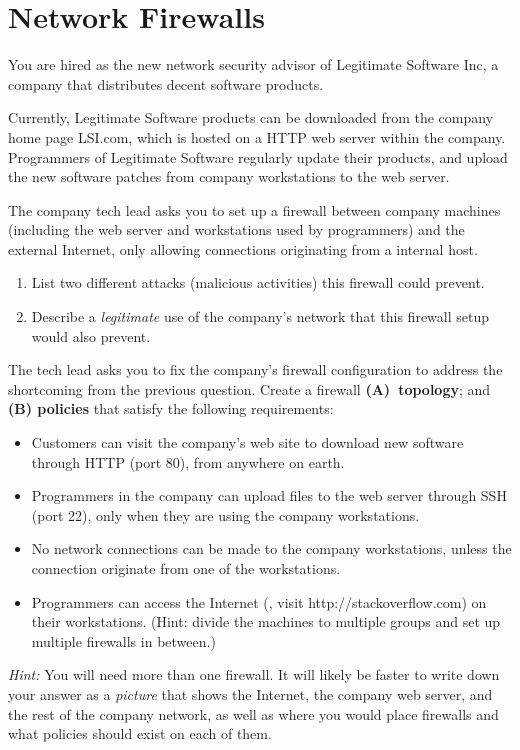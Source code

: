 \newpage
\section{Network Firewalls}

You are hired as the new network security advisor of Legitimate
Software Inc, a company that distributes decent software products. 

Currently, Legitimate Software products can be downloaded from the company
home page LSI.com, which is hosted on a HTTP web server within the company.
Programmers of Legitimate Software regularly update their products, and upload
the new software patches from company workstations to the web server.

The company tech lead asks you to set up a firewall between company
machines (including the web server and workstations used by programmers) and
the external Internet, only allowing connections originating from a internal
host. 
\begin{enumerate}
\item List two different attacks (malicious activities) this firewall could
prevent. 
\item Describe a {\em legitimate} use of the company's
network that this firewall setup would also prevent.
\end{enumerate}

\eprob

\newpage
{} The tech lead asks you to fix the company's firewall configuration
to address the
shortcoming from
the previous question. Create a firewall
{\bf (A)~topology}; and {\bf (B) policies} that satisfy the following requirements:

\begin{itemize}
\item Customers
can visit the company's web site to download new software through HTTP (port
80), from anywhere on earth. 
\item Programmers in the company can upload files to
the web server through SSH (port 22), only when they are using the company
workstations. 
\item No network connections can be made to the company
workstations, unless the connection originate from one of the workstations. 
\item
Programmers can access the Internet (\eg, visit http://stackoverflow.com) on
their workstations. (Hint: divide the machines to multiple groups and set up
multiple firewalls in between.)
\end{itemize}
{\em Hint:} You will need more than one firewall. It will likely be faster to
write down your answer as a {\em picture} that shows the Internet, the company
web server, and the rest of the company network, as well as where you would
place firewalls and what policies should exist on each of them.

